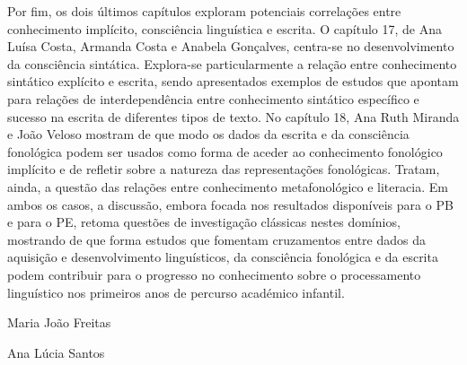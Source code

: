 \begin{refsection}
Por fim, os dois últimos capítulos exploram potenciais correlações entre conhecimento implícito, consciência linguística e escrita. O capítulo 17, de Ana Luísa Costa, Armanda Costa e Anabela Gonçalves, centra-se no desenvolvimento da consciência sintática. Explora-se particularmente a relação entre conhecimento sintático explícito e escrita, sendo apresentados exemplos de estudos que apontam para relações de interdependência entre conhecimento sintático específico e sucesso na escrita de diferentes tipos de texto. No capítulo 18, Ana Ruth Miranda e João Veloso mostram de que modo os dados da escrita e da consciência fonológica podem ser usados como forma de aceder ao conhecimento fonológico implícito e de refletir sobre a natureza das representações fonológicas. Tratam, ainda, a questão das relações entre conhecimento metafonológico e literacia. Em ambos os casos, a discussão, embora focada nos resultados disponíveis para o PB e para o PE, retoma questões de investigação clássicas nestes domínios, mostrando de que forma estudos que fomentam cruzamentos entre dados da aquisição e desenvolvimento linguísticos, da consciência fonológica e da escrita podem contribuir para o progresso no conhecimento sobre o processamento linguístico nos primeiros anos de percurso académico infantil. 

\hfill Maria João Freitas

\hfill Ana Lúcia Santos





\printbibliography[heading=subbibliography]
\end{refsection}